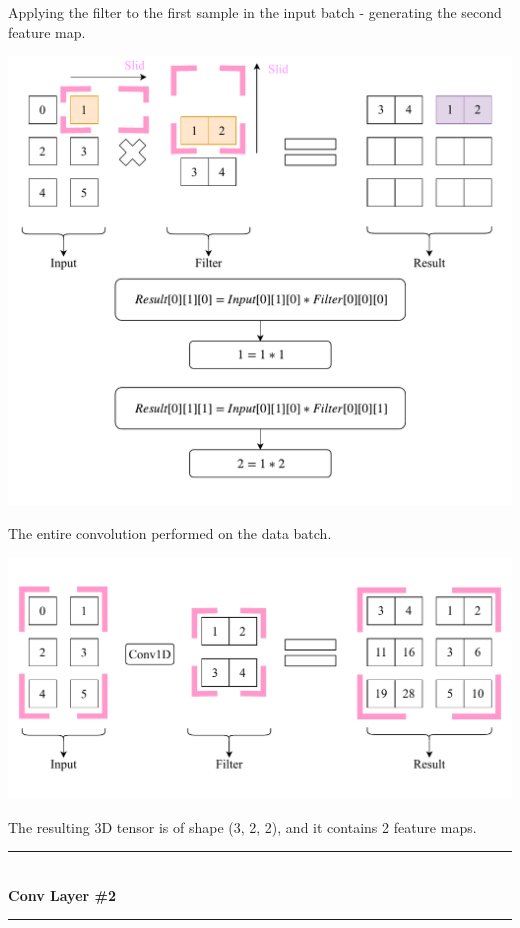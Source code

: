 \documentclass[a4paper, 12pt]{report}
\newcommand\tab[1][1cm]{\hspace*{#1}}
\begin{document}
\begin{blockfigure}{ Applying the filter to the first sample in the input batch - generating the second feature map.}
	\begin{center}
		\includegraphics[width=\textwidth]{firstConvSample_step3}
	\end{center}
\end{blockfigure}
\begin{blockfigure}{ The entire convolution performed on the data batch.}
		\begin{center}
			\includegraphics[width=\textwidth]{firstConvSample_final}
		\end{center}
\end{blockfigure}
\tab The resulting 3D tensor is of shape (3, 2, 2), and it contains 2 feature maps.
\newpage
	{
		
		\color{blue-primary-alt} 
		\rule{2.1cm}{0.4mm}\\[0.2cm]
		\textbf{Conv Layer \#2}\\
		\rule{2.1cm}{0.4mm}
	}\\\\
\end{document}
